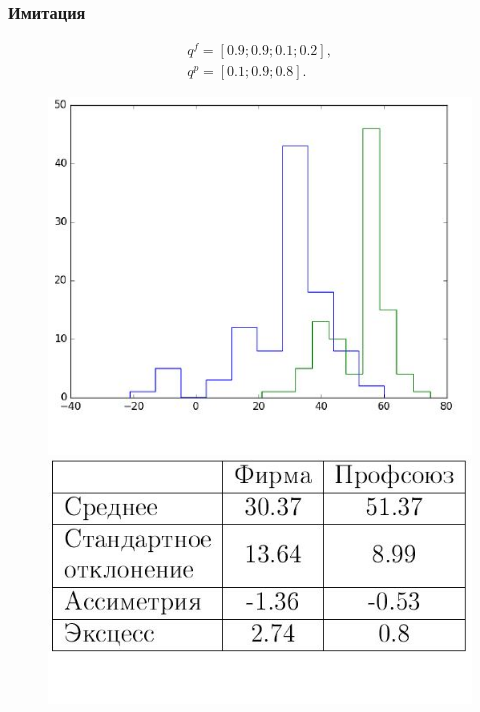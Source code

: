 \documentclass {beamer}
\begin{document}
\begin{frame}
	\frametitle{Имитация}
  \begin{gather*}
  q^f = \left[ 0.9; 0.9; 0.1; 0.2 \right], \\
  q^p = \left[ 0.1; 0.9; 0.8 \right].
  \end{gather*}
	\begin{figure}
		\begin{minipage}[b]{0.45\textwidth}
			
			\includegraphics[width=\textwidth]{firm4}
		\end{minipage}
		\begin{minipage}[b]{0.45\textwidth}
			
			\includegraphics[width=\textwidth]{firmtable4}
		\end{minipage}
		
	\end{figure}
\end{frame}
\end{document}
